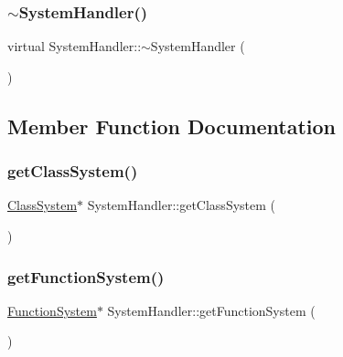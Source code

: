 \subsubsection{\texorpdfstring{$\sim$\+System\+Handler()}{~SystemHandler()}}
{\footnotesize\ttfamily virtual System\+Handler\+::$\sim$\+System\+Handler (\begin{DoxyParamCaption}{ }\end{DoxyParamCaption})\hspace{0.3cm}{\ttfamily [virtual]}}



\subsection{Member Function Documentation}
\mbox{\label{classSystemHandler_a218066abe52952bf45c3ba21fdf86368}} 
\subsubsection{\texorpdfstring{get\+Class\+System()}{getClassSystem()}}
{\footnotesize\ttfamily \hyperlink{classClassSystem}{Class\+System}$\ast$ System\+Handler\+::get\+Class\+System (\begin{DoxyParamCaption}{ }\end{DoxyParamCaption})}

\mbox{\label{classSystemHandler_a052dfd8bfff27ed9bf12fd84e066ecb3}} 
\subsubsection{\texorpdfstring{get\+Function\+System()}{getFunctionSystem()}}
{\footnotesize\ttfamily \hyperlink{classFunctionSystem}{Function\+System}$\ast$ System\+Handler\+::get\+Function\+System (\begin{DoxyParamCaption}{ }\end{DoxyParamCaption})}

\mbox{\label{classSystemHandler_a2d30e2dd0efb6287ae14b36f1c6bb48b}} 

